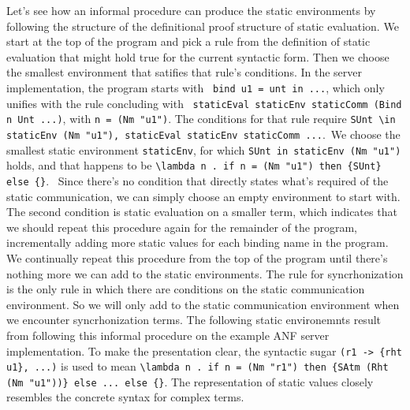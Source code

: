 \documentclass[10pt]{article}
\begin{document}
Let's see how an informal procedure can produce the static environments by following the
structure of the definitional proof structure of static evaluation.
We start at the top of the program and pick a
rule from the definition of static evaluation that might hold true for the current syntactic form.
Then we choose the smallest environment that satifies that rule's conditions. 
In the server implementation, the program starts with \
\lstinline[language=normal_lang, mathescape]{bind u1 = unt in ...}, which only unifies with 
the rule concluding with \
\lstinline[language=logic, mathescape]{staticEval staticEnv staticComm (Bind n Unt ...)},
with \lstinline[language=logic, mathescape]{n = (Nm "u1")}. 
The conditions for that rule require 
\lstinline[language=logic, mathescape]{SUnt \in staticEnv (Nm "u1"), staticEval staticEnv staticComm ...}.\
We choose the smallest static environment \lstinline{staticEnv}, for which
\lstinline[language=logic]{SUnt in staticEnv (Nm "u1")} holds, and that happens to be 
\lstinline[language=logic]|\lambda n . if n = (Nm "u1") then {SUnt} else {}|. \
Since there's no condition that directly states what's required of the static communication, we can
simply choose an empty environment to start with. The second condition is static evaluation on
a smaller term, which indicates that we should repeat this procedure again for the remainder of
the program, incrementally adding more static values for each binding name in the program.
We continually repeat this procedure from the top of the program until there's
nothing more we can add to the static environments.
The rule for syncrhonization is the only rule in which there are conditions on
the static communication environment. So we will only add to the static communication
environment when we encounter syncrhonization terms.
The following static environemnts result from following this informal procedure on
the example ANF server implementation.
To make the presentation clear, the syntactic sugar \lstinline|(r1 -> {rht u1}, ...)| is used 
to mean \lstinline[language=logic]|\lambda n . if n = (Nm "r1") then {SAtm (Rht (Nm "u1"))} else ... else {}|.
The representation of static values closely resembles the concrete syntax for complex terms.
\end{document}
